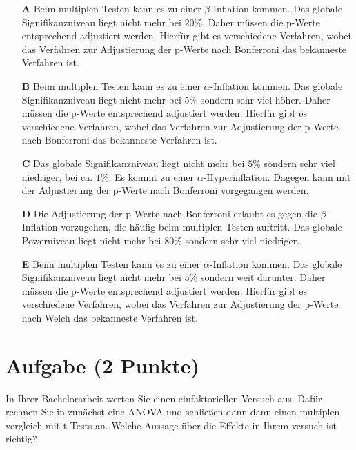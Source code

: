 \documentclass[a4paper, 9pt]{scrartcl}\usepackage[]{graphicx}\usepackage[]{xcolor}
\begin{document}
\begin{enumerate}
\item [\textbf{A} \msquare] Beim multiplen Testen kann es zu einer $\beta$-Inflation kommen. Das globale Signifikanzniveau liegt nicht mehr bei $20\%$. Daher müssen die p-Werte entsprechend adjustiert werden. Hierfür gibt es verschiedene Verfahren, wobei das Verfahren zur Adjustierung der p-Werte nach Bonferroni das bekanneste Verfahren ist.
\item [\textbf{B} \msquare] Beim multiplen Testen kann es zu einer $\alpha$-Inflation kommen. Das globale Signifikanzniveau liegt nicht mehr bei $5\%$ sondern sehr viel höher. Daher müssen die p-Werte entsprechend adjustiert werden. Hierfür gibt es verschiedene Verfahren, wobei das Verfahren zur Adjustierung der p-Werte nach Bonferroni das bekanneste Verfahren ist.
\item [\textbf{C} \msquare] Das globale Signifikanzniveau liegt nicht mehr bei $5\%$ sondern sehr viel niedriger, bei ca. $1\%$. Es kommt zu einer $\alpha$-Hyperinflation. Dagegen kann mit der Adjustierung der p-Werte nach Bonferroni vorgegangen werden.
\item [\textbf{D} \msquare] Die Adjustierung der p-Werte nach Bonferroni erlaubt es gegen die $\beta$-Inflation vorzugehen, die häufig beim multiplen Testen auftritt. Das globale Powerniveau liegt nicht mehr bei $80\%$ sondern sehr viel niedriger.
\item [\textbf{E} \msquare] Beim multiplen Testen kann es zu einer $\alpha$-Inflation kommen. Das globale Signifikanzniveau liegt nicht mehr bei $5\%$ sondern weit darunter. Daher müssen die p-Werte entsprechend adjustiert werden. Hierfür gibt es verschiedene Verfahren, wobei das Verfahren zur Adjustierung der p-Werte nach Welch das bekanneste Verfahren ist.
\end{enumerate}

\section{Aufgabe \hfill (2 Punkte)}




In Ihrer Bachelorarbeit werten Sie einen einfaktoriellen Versuch aus. Dafür rechnen Sie in \Rlogo zunächst eine ANOVA und schließen dann dann einen multiplen vergleich mit t-Tests an. Welche Aussage über die Effekte in Ihrem versuch ist richtig?
\end{document}
